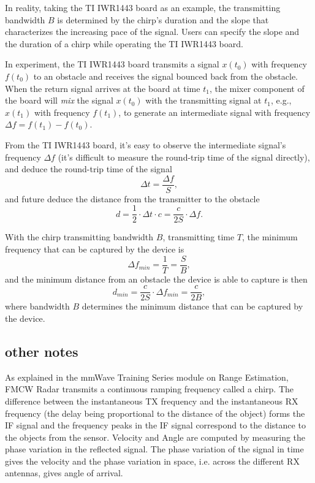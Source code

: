 \documentclass[11pt, oneside]{article}   	%
\begin{document}
In reality, taking the TI IWR1443 board as an example, the transmitting bandwidth $B$ is determined by the chirp's duration and the slope that characterizes the increasing pace of the signal. Users can specify the slope and the duration of a chirp while operating the TI IWR1443 board.

In experiment, the TI IWR1443 board transmits a signal $x(t_0)$ with frequency $f(t_0)$ to an obstacle and receives the signal bounced back from the obstacle. When the return signal arrives at the board at time $t_1$, the mixer component of the board will \emph{mix} the signal $x(t_0)$ with the transmitting signal at $t_1$, e.g., $x(t_1)$ with frequency $f(t_1)$, to generate an intermediate signal with frequency $\Delta f = f(t_1) - f(t_0)$. 

From the TI IWR1443 board, it's easy to observe the intermediate signal's frequency $\Delta f$ (it's difficult to measure the round-trip time of the signal directly), and deduce the round-trip time of the signal 
$$\Delta t = \frac{\Delta f}{S},$$
and future deduce the distance from the transmitter to the obstacle 
$$d = \frac{1}{2}\cdot \Delta t \cdot c = \frac{c}{2S}\cdot \Delta f.$$

With the chirp transmitting bandwidth $B$, transmitting time $T$, the minimum frequency that can be captured by the device is 
$$\Delta f_{min} = \frac{1}{T} = \frac{S}{B}, $$ and the minimum distance from an obstacle the device is able to capture is then 
$$d_{min} = \frac{c}{2S}\cdot \Delta f_{min} = \frac{c}{2B},$$
where bandwidth $B$ determines the minimum distance that can be captured by the device.

\subsection{other notes}

As explained in the mmWave Training Series module on Range Estimation, FMCW Radar transmits a continuous ramping frequency called a chirp. The difference between the instantaneous TX frequency and the instantaneous RX frequency (the delay being proportional to the distance of the object) forms the IF signal and the frequency peaks in the IF signal correspond to the distance to the objects from the sensor. Velocity and Angle are computed by measuring the phase variation in the reflected signal. The phase variation of the signal in time gives the velocity and the phase variation in space, i.e. across the different RX antennas, gives angle of arrival.
\end{document}
